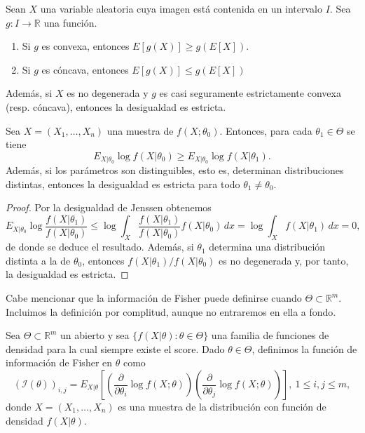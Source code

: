     \begin{lem}
        Sean $X$ una variable aleatoria cuya imagen está contenida en un intervalo $I$. Sea $g: I \to \mathbb{R}$ una función.
        \begin{enumerate}
            \item Si $g$ es convexa, entonces $E[g(X)] \ge g(E[X])$.
            \item Si $g$ es cóncava, entonces $E[g(X)] \le g(E[X])$
        \end{enumerate}
        Además, si $X$ es no degenerada y $g$ es casi seguramente estrictamente convexa (resp. cóncava), entonces la desigualdad es estricta.
    \end{lem}

    \begin{prop} \label{prop:desigualdad}
        Sea $X = (X_1, \ldots, X_n)$ una muestra de $f(X;\theta_0)$. Entonces, para cada $\theta_1 \in \Theta$ se tiene
        \[E_{X|\theta_0} \log f(X|\theta_0) \ge E_{X|\theta_0} \log f(X|\theta_1).\]
        Además, si los parámetros son distinguibles, esto es, determinan distribuciones distintas, entonces la desigualdad es estricta para todo $\theta_1 \ne \theta_0$.
    \end{prop}
    \begin{proof}
        Por la desigualdad de Jenssen obtenemos
        \[E_{X|\theta_0} \log \frac{f(X|\theta_1)}{f(X|\theta_0)} \le \log \int_X \frac{f(X|\theta_1)}{f(X|\theta_0)} f(X|\theta_0) \, dx = \log \int_X f(X|\theta_1) \, dx = 0,\]
        de donde se deduce el resultado. Además, si $\theta_1$ determina una distribución distinta a la de $\theta_0$, entonces $f(X|\theta_1) / f(X|\theta_0)$ es no degenerada y, por tanto, la desigualdad es estricta.
    \end{proof}

    Cabe mencionar que la información de Fisher puede definirse cuando $\Theta \subset \mathbb{R}^m$. Incluimos la definición por complitud, aunque no entraremos en ella a fondo.

    \begin{definition}
        Sea $\Theta \subset \mathbb{R}^m$ un abierto y sea $\{f(X|\theta): \theta \in \Theta\}$ una familia de funciones de densidad para la cual siempre existe el score. Dado $\theta \in \Theta$, definimos la función de información de Fisher en $\theta$ como
        \[{\left(\mathcal{I} \left(\theta \right) \right)}_{i, j} = E_{X|\theta} \left[
          \left(\frac{\partial}{\partial\theta_i} \log f(X;\theta)\right)
          \left(\frac{\partial}{\partial\theta_j} \log f(X;\theta)\right)\right], \ 1 \le i,j \le m,\]
        donde $X = (X_1, \ldots, X_n)$ es una muestra de la distribución con función de densidad $f(X|\theta)$.
    \end{definition}

